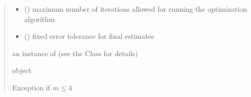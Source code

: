 \documentclass[letterpaper,10pt,english]{sphinxmanual}
\begin{document}
\begin{fulllineitems}
\begin{quote}
\begin{description}
\begin{itemize}
\item {} 
\sphinxAtStartPar
{} () \textendash{} maximum number of iterations allowed for running the optimization algorithm

\item {} 
\sphinxAtStartPar
{} () \textendash{} fixed error tolerance for final estimates

\end{itemize}

\sphinxAtStartPar
an instance of  (see the Class for details)

\sphinxAtStartPar
object

\sphinxAtStartPar
Exception if \(m \leq 4\)

\end{description}\end{quote}

\end{fulllineitems}

\end{document}
